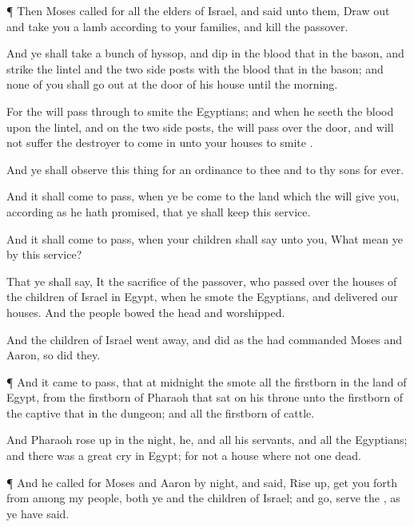 {\par }{\PP {}¶ Then
Moses
called for all the
elders of
Israel, and
said unto them, Draw
out and
take you a
lamb according to your
families, and
kill the
passover.

And ye shall
take a
bunch of
hyssop, and
dip
{} in the
blood that
{} in the
bason, and
strike the
lintel and the
two side
posts with the
blood that
{} in the
bason; and
none of you shall go
out at the
door of his
house until the
morning.

For the
{} will pass
through to
smite the
Egyptians; and when he
seeth the
blood upon the
lintel, and on the
two side
posts, the
{} will pass
over the
door, and will not
suffer the
destroyer to
come in unto your
houses to
smite
{}.

And ye shall
observe this
thing for an
ordinance to thee and to thy
sons
for
ever.

And it shall come to pass, when ye be
come to the
land which the
{} will
give you, according as he hath
promised, that ye shall
keep this
service.

And it shall come to pass, when your
children shall
say unto you, What mean ye by this
service?

That ye shall
say, It
{} the
sacrifice of the
{}
passover, who
passed over the
houses of the
children of
Israel in
Egypt, when he
smote the
Egyptians, and
delivered our
houses. And the
people bowed the
head and
worshipped.

And the
children of
Israel went
away, and
did as the
{} had
commanded
Moses and
Aaron, so
did they.


\par }{\PP {}¶ And it came to pass, that at
midnight the
{}
smote all the
firstborn in the
land of
Egypt, from the
firstborn of
Pharaoh that
sat on his
throne unto the
firstborn of the
captive that
{} in the
dungeon; and all the
firstborn of
cattle.

And
Pharaoh rose
up in the
night, he, and all his
servants, and all the
Egyptians; and there was a
great
cry in
Egypt; for
{} not a
house where
{} not one
dead.


\par }{\PP {}¶ And he
called for
Moses and
Aaron by
night, and
said, Rise
up,
{} get you
forth from
among my
people, both ye and the
children of
Israel; and
go,
serve the
{}, as ye have
said.

}
